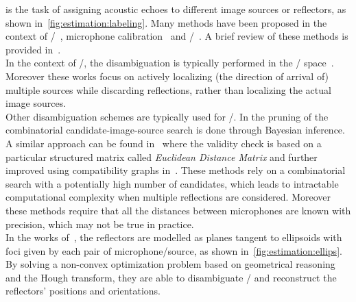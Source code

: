   is the task of assigning acoustic echoes to different image sources or reflectors, as shown in~\cref{fig:estimation:labeling}.
Many methods have been proposed in the context of \SSL/~, microphone calibration~
and \RooGE/~.
A brief review of these methods is provided in~.
\\In the context of \SSL/, the disambiguation is typically performed in the \TDOA/ space~.
Moreover these works focus on actively localizing (the direction of arrival of) multiple sources while discarding reflections, rather than localizing the actual image sources.
\\Other disambiguation schemes are typically used for \RooGE/.
In  the pruning of the combinatorial candidate-image-source search is done through Bayesian inference.
A similar approach can be found in~ where the validity check is based on a particular structured matrix called \textit{Euclidean Distance Matrix} and further improved using compatibility graphs in~.
These methods rely on a combinatorial search with a potentially high number of candidates, which leads to intractable computational complexity when multiple reflections are considered.
Moreover these methods require that all the distances between microphones are known with precision, which may not be true in practice.
\\In the works of~, the reflectors are modelled as planes tangent to ellipsoids with foci given by each pair of microphone/source, as shown in~\cref{fig:estimation:ellips}. By solving a non-convex optimization problem based on geometrical reasoning and the Hough transform, they are able to disambiguate \TOAs/ and reconstruct the reflectors' positions and orientations.
